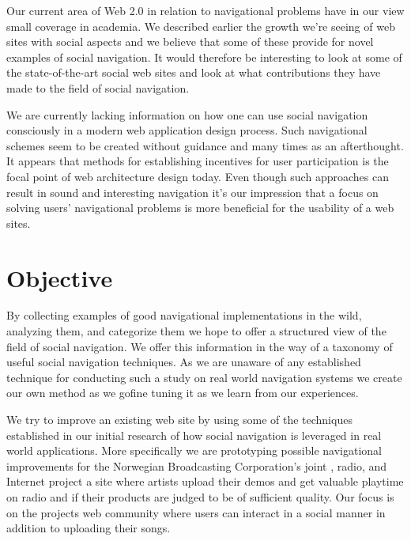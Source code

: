 Our current area of Web 2.0 in relation to navigational problems have in our
view small coverage in academia.
We described earlier the growth we're seeing of web sites with social
aspects and we believe that some of these provide for novel examples of social
navigation. It would therefore be interesting to look at some of the
state-of-the-art social web sites and look at what contributions they have
made to the field of social navigation.

We are currently lacking information on how one can use social navigation
consciously in a modern web application design process. Such navigational
schemes seem to be created without guidance and many times as an afterthought.
It appears that methods for establishing incentives for user participation
is the focal point of web architecture design today. Even though such
approaches can result in sound and interesting navigation it's our impression
that a focus on solving users' navigational problems is more beneficial for
the usability of a web sites.

\section{Objective}

By collecting examples of good navigational implementations in the wild,
analyzing them, and categorize them we hope to offer a structured view of the
field of social navigation. We offer this information in the way of a taxonomy
of useful social navigation techniques.
As we are unaware of any established technique for
conducting such a study on real world navigation systems we create our own
method as we go\dash{}fine tuning it as we learn from our experiences.

We try to improve an existing web site by using some of the techniques
established in our initial research of how social navigation is leveraged
in real world applications. More specifically we are prototyping possible
navigational improvements for the Norwegian Broadcasting Corporation's joint
, radio, and Internet project \project{\urort}\dash{}a site where
artists upload their demos and get valuable playtime on radio and  if
their products are judged to be of sufficient quality. Our focus is on the
projects web community%
where users can interact in a social manner in addition to uploading
their songs.

